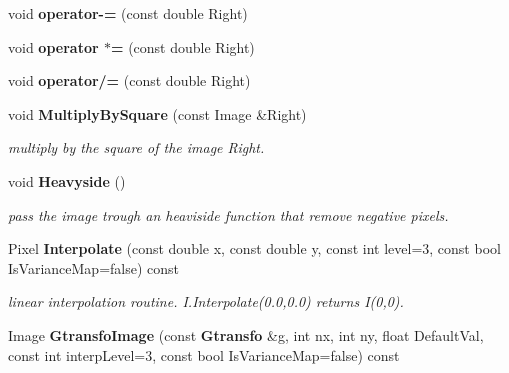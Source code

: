 \begin{CompactItemize}
\item 
{}
void {\bf operator-=} (const double Right)\label{class_image_a40}

\item 
{}
void {\bf operator $\ast$=} (const double Right)\label{class_image_a41}

\item 
{}
void {\bf operator/=} (const double Right)\label{class_image_a42}

\item 
{}
void {\bf Multiply\-By\-Square} (const Image \&Right)\label{class_image_a43}

\begin{CompactList}\small\item\em multiply by the square of the image Right.\item\end{CompactList}\item 
{}
void {\bf Heavyside} ()\label{class_image_a44}

\begin{CompactList}\small\item\em pass the image trough an heaviside function that remove negative pixels.\item\end{CompactList}\item 
{}
Pixel {\bf Interpolate} (const double x, const double y, const int level=3, const bool Is\-Variance\-Map=false) const\label{class_image_a45}

\begin{CompactList}\small\item\em linear interpolation routine. I.Interpolate(0.0,0.0) returns I(0,0).\item\end{CompactList}\item 
{}
Image {\bf Gtransfo\-Image} (const {\bf Gtransfo} \&g, int nx, int ny, float Default\-Val, const int interp\-Level=3, const bool Is\-Variance\-Map=false) const\label{class_image_a46}


\end{CompactItemize}
